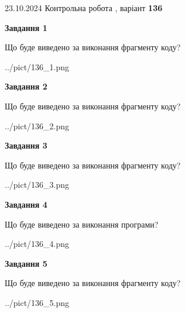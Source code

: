 \documentclass[12pt, ukrainian]{article}
\begin{document}
{\Large{23.10.2024 Контрольна робота , варіант  \No \textbf { 136 }\par}}
{
\begin {large}
{\begin {center}\textbf{Завдання 1}\end {center}}

Що буде виведено за виконання фрагменту коду?\par
\begin{center}
	{../pict/136_1.png}
\end{center}
\newpage

{\begin {center}\textbf{Завдання 2}\end {center}}

Що буде виведено за виконання фрагменту коду?\par
\begin{center}
	{../pict/136_2.png}
\end{center}
\newpage

{\begin {center}\textbf{Завдання 3}\end {center}}

Що буде виведено за виконання фрагменту коду?\par
\begin{center}
	{../pict/136_3.png}
\end{center}
\newpage

{\begin {center}\textbf{Завдання 4}\end {center}}

Що буде виведено за виконання програми?\par
\begin{center}
	{../pict/136_4.png}
\end{center}
\newpage

{\begin {center}\textbf{Завдання 5}\end {center}}

Що буде виведено за виконання фрагменту коду?\par
\begin{center}
	{../pict/136_5.png}
\end{center}
\newpage


\end{large}}
\end{document}
